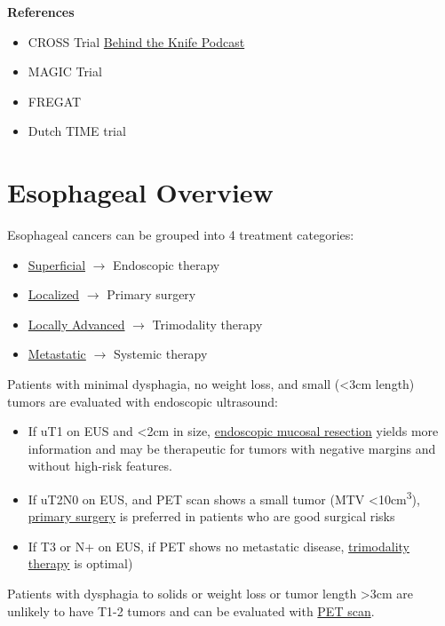 \documentclass[
]{book}
\providecommand{\tightlist}{%
  \setlength{\itemsep}{0pt}\setlength{\parskip}{0pt}}
\begin{document}
\textbf{References}

\begin{itemize}
\tightlist
\item
  CROSS Trial \href{https://www.youtube.com/watch?v=4XWNr4rJXQ}{Behind the Knife Podcast}
\item
  MAGIC Trial
\item
  FREGAT
\item
  Dutch TIME trial
\end{itemize}

\hypertarget{EsoIntro}{%
\chapter{Esophageal Overview}\label{EsoIntro}}

Esophageal cancers can be grouped into 4 treatment categories:

\begin{itemize}
\tightlist
\item
  \protect\hyperlink{superficial}{Superficial} \(\rightarrow\) Endoscopic therapy
\item
  \protect\hyperlink{localized}{Localized} \(\rightarrow\) Primary surgery
\item
  \protect\hyperlink{locally_advanced}{Locally Advanced} \(\rightarrow\) Trimodality therapy
\item
  \protect\hyperlink{metastatic}{Metastatic} \(\rightarrow\) Systemic therapy
\end{itemize}

Patients with minimal dysphagia, no weight loss, and small (\textless3cm length) tumors are evaluated with endoscopic ultrasound:

\begin{itemize}
\tightlist
\item
  If uT1 on EUS and \textless2cm in size, \protect\hyperlink{emr}{endoscopic mucosal resection} yields more information and may be therapeutic for tumors with negative margins and without high-risk features.
\item
  If uT2N0 on EUS, and PET scan shows a small tumor (MTV \textless10cm\textsuperscript{3}), \protect\hyperlink{primary_surgery}{primary surgery} is preferred in patients who are good surgical risks
\item
  If T3 or N+ on EUS, if PET shows no metastatic disease, \protect\hyperlink{trimodality}{trimodality therapy} is optimal)
\end{itemize}

Patients with dysphagia to solids or weight loss or tumor length \textgreater3cm are unlikely to have T1-2 tumors and can be evaluated with \protect\hyperlink{pet}{PET scan}.
\end{document}
